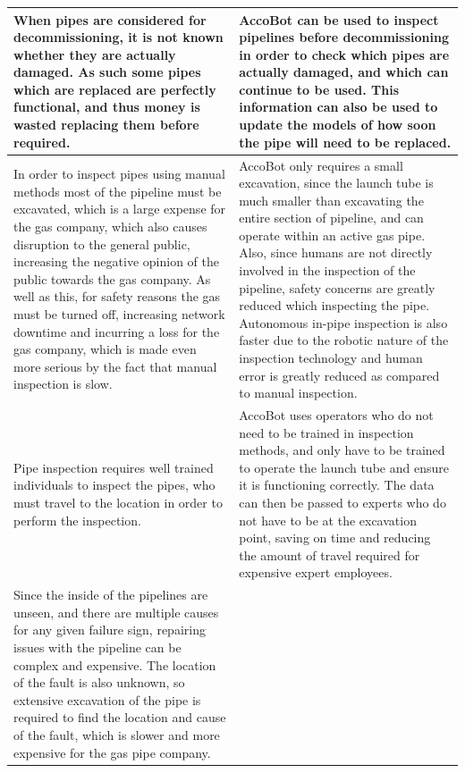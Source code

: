 \documentclass[11pt]{article}		%
\begin{document}
\begin{longtable}[c]{| m{} | m{} |}
			\hline
			\rowcolor{rowGrey}
			When pipes are considered for decommissioning, it is not known whether they are actually damaged. 
			As such some pipes which are replaced are perfectly functional, and thus money is wasted replacing them before required. 
			& 
			AccoBot can be used to inspect pipelines before decommissioning in order to check which pipes are actually damaged, and which can continue to be used. 
			This information can also be used to update the models of how soon the pipe will need to be replaced.
			\\
			\hline
			\rowcolor{rowGrey}
			In order to inspect pipes using manual methods most of the pipeline must be excavated, which is a large expense for the gas company, which also causes disruption to the general public, increasing the negative opinion of the public towards the gas company. 
			As well as this, for safety reasons the gas must be turned off, increasing network downtime and incurring a loss for the gas company, which is made even more serious by the fact that manual inspection is slow.
			& 
			AccoBot only requires a small excavation, since the launch tube is much smaller than excavating the entire section of pipeline, and can operate within an active gas pipe.
			Also, since humans are not directly involved in the inspection of the pipeline, safety concerns are greatly reduced which inspecting the pipe.
			Autonomous in-pipe inspection is also faster due  to the robotic nature of the inspection technology and human error is greatly reduced as compared to manual inspection. %
			\\
			\hline
			\rowcolor{rowGrey}
			Pipe inspection requires well trained individuals to inspect the pipes, who must travel to the location in order to perform the inspection.
			& 
			AccoBot uses operators who do not need to be trained in inspection methods, and only have to be trained to operate the launch tube and ensure it is functioning correctly.
			The data can then be passed to experts who do not have to be at the excavation point, saving on time and reducing the amount of travel required for expensive expert employees.
			\\
			\hline
			\rowcolor{rowGrey}
			Since the inside of the pipelines are unseen, and there are multiple causes for any given failure sign, repairing issues with the pipeline can be complex and expensive.
			The location of the fault is also unknown, so extensive excavation of the pipe is required to find the location and cause of the fault, which is slower and more expensive for the gas pipe company.

\end{longtable}
\end{document}
